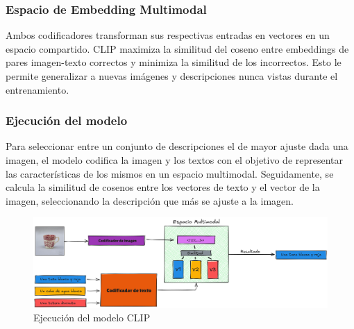 		\subsubsection*{Espacio de Embedding Multimodal}
			Ambos codificadores transforman sus respectivas entradas en vectores en un espacio compartido. CLIP maximiza la similitud del coseno entre embeddings de pares imagen-texto correctos y minimiza la similitud de los incorrectos. Esto le permite generalizar a nuevas imágenes y descripciones nunca vistas durante el entrenamiento.
			
		\subsubsection*{Ejecución del modelo}
			Para seleccionar entre un conjunto de descripciones el de mayor ajuste dada una imagen, el modelo codifica la imagen y los textos con el objetivo de representar las características de los mismos en un espacio multimodal. Seguidamente, se calcula la similitud de cosenos entre los vectores de texto y el vector de la imagen, seleccionando la descripción que más se ajuste a la imagen.

			\begin{figure}[h] 
				\centering
				\includegraphics[width=1\textwidth]{Graphics/run_clip} 
				\caption{Ejecución del modelo CLIP}
				\label{fig:Ejecución del modelo CLIP}
			\end{figure}

